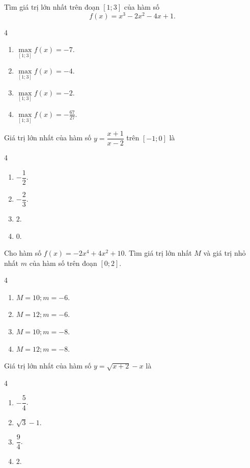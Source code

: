 \begin{baitap}
	Tìm giá trị lớn nhất trên đoạn $[1; 3]$ của hàm số $$f(x) = x^3 - 2x^2 - 4x + 1.$$
	\begin{multicols}{4}
		\begin{enumerate}[\quad \bf A.]
			\item $\max\limits_{[1;3]} f(x) = -7$.
			\item $\max\limits_{[1;3]} f(x) = -4$.
			\item $\max\limits_{[1;3]} f(x) = -2$.
			\item $\max\limits_{[1;3]} f(x) = -\frac{67}{27}$.
		\end{enumerate}
	\end{multicols}
\end{baitap}

\begin{baitap}
	Giá trị lớn nhất của hàm số $y = \dfrac{x + 1}{x - 2}$ trên $[-1; 0]$ là
	\begin{multicols}{4}
		\begin{enumerate}[\quad \bf A.]
			\item $-\dfrac{1}{2}$.
			\item $-\dfrac{2}{3}$.
			\item $2$.
			\item $0$.
		\end{enumerate}
	\end{multicols}
\end{baitap}

\begin{baitap}
	 Cho hàm số $f(x) = -2x^4 + 4x^2 + 10$. Tìm giá trị lớn nhất $M$ và giá trị nhỏ nhất $m$ của hàm số trên đoạn $[0; 2]$.
	\begin{multicols}{4}
		\begin{enumerate}[\quad \bf A.]
			\item $M = 10; m = -6$.
			\item $M = 12; m = -6$.
			\item $M = 10; m = -8$.
			\item $M = 12; m = -8$.
		\end{enumerate}
	\end{multicols}
\end{baitap}

\begin{baitap}
	Giá trị lớn nhất của hàm số $y = \sqrt{x + 2} - x$ là
	\begin{multicols}{4}
		\begin{enumerate}[\quad \bf A.]
			\item $-\dfrac{5}{4}$.
			\item $\sqrt{3} - 1$.
			\item $\dfrac{9}{4}$.
			\item $2$.
		\end{enumerate}
	\end{multicols}
\end{baitap}

